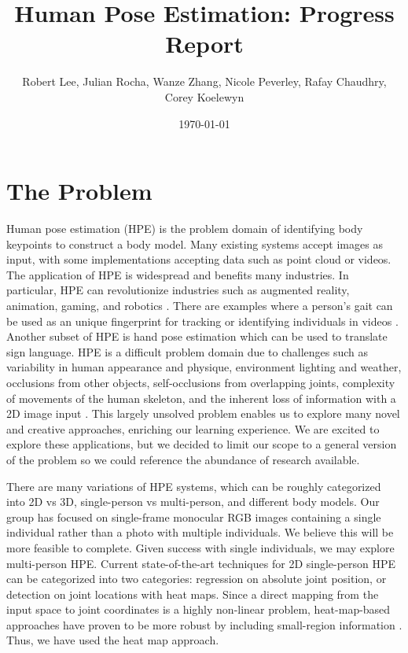\documentclass[11pt, letterpaper]{article}
\title{\textbf{Human Pose Estimation: Progress Report}}
\author{Robert Lee, Julian Rocha, Wanze Zhang, Nicole Peverley, Rafay Chaudhry, Corey Koelewyn}
\date{\today}
\begin{document}
\maketitle

\section{The Problem}

Human pose estimation (HPE) is the problem domain of identifying body keypoints to construct a body model. Many existing systems accept images as input, with some implementations accepting data such as point cloud or videos. The application of HPE is widespread and benefits many industries. In particular, HPE can revolutionize industries such as augmented reality, animation, gaming, and robotics \cite{fritz_ai_hpe}. There are examples where a person’s gait can be used as an unique fingerprint for tracking or identifying individuals in videos \cite{ZENG_2012_92}. Another subset of HPE is hand pose estimation which can be used to translate sign language. HPE is a difficult problem domain due to challenges such as variability in human appearance and physique, environment lighting and weather, occlusions from other objects, self-occlusions from overlapping joints, complexity of movements of the human skeleton, and the inherent loss of information with a 2D image input \cite{Sigal2014}. This largely unsolved problem enables us to explore many novel and creative approaches, enriching our learning experience. We are excited to explore these applications, but we decided to limit our scope to a general version of the problem so we could reference the abundance of research available.

There are many variations of HPE systems, which can be roughly categorized into 2D vs 3D, single-person vs multi-person, and different body models. Our group has focused on single-frame monocular RGB images containing a single individual rather than a photo with multiple individuals. We believe this will be more feasible to complete. Given success with single individuals, we may explore multi-person HPE. Current state-of-the-art techniques for 2D single-person HPE can be categorized into two categories: regression on absolute joint position, or detection on joint locations with heat maps. Since a direct mapping from the input space to joint coordinates is a highly non-linear problem, heat-map-based approaches have proven to be more robust by including small-region information \cite{Chen_2020}. Thus, we have used the heat map approach.
\end{document}
